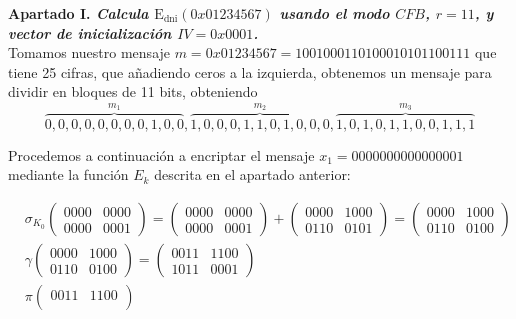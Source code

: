 \documentclass[fleqn]{article}
\begin{document}
    \newpage
    \textbf{Apartado I. \textit{Calcula $\text{E}_{\text{dni}}(0x01234567)$ usando el modo $CFB$, $r=11$, y vector de 
            inicialización $IV = 0x0001$.}}\\

    Tomamos nuestro mensaje $m = 0x01234567 = 1001000110100010101100111$ que tiene 25 cifras, que añadiendo ceros a la izquierda,
    obtenemos un mensaje para dividir en bloques de 11 bits, obteniendo
    $$\overbrace{0,0,0,0,0,0,0,0,1,0,0}^{m_1},\overbrace{1,0,0,0,1,1,0,1,0,0,0}^{m_2},\overbrace{1,0,1,0,1,1,0,0,1,1,1}^{m_3} $$

    Procedemos a continuación a encriptar el mensaje $x_1 = 0000000000000001$ mediante la función $E_k$ descrita en el apartado anterior:

    \begin{equation*}
        \begin{aligned}
            &\sigma_{K_0}
            \begin{pmatrix}
                0000 & 0000 \\
                0000 & 0001
            \end{pmatrix} = 
            \begin{pmatrix}
                0000 & 0000 \\
                0000 & 0001
            \end{pmatrix} + 
            \begin{pmatrix}
                0000 & 1000 \\
                0110 & 0101
            \end{pmatrix} = 
            \begin{pmatrix}
                0000 & 1000 \\
                0110 & 0100
            \end{pmatrix} \\
            &\gamma \begin{pmatrix}
                0000 & 1000 \\
                0110 & 0100
            \end{pmatrix} =
            \begin{pmatrix}
                0011 & 1100 \\
                1011 & 0001
            \end{pmatrix} \\
            &\pi \begin{pmatrix}
                0011 & 1100 \\

\end{pmatrix}
\end{aligned}
\end{equation*}
\end{document}
